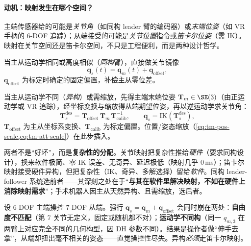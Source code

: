 \paragraph{动机：映射发生在哪个空间？}
主端传感器给的可能是\emph{关节角}（如同构 leader 臂的编码器）或\emph{末端位姿}（如 VR 手柄的 $6$-DOF 追踪）；从端接受的可能是\emph{关节位置}指令或\emph{笛卡尔位姿}（需 IK）。映射在关节空间还是笛卡尔空间，不只是工程便利，而是两种设计哲学。

\begin{definition}[关节空间映射]\label{def:tm-jointmap}
当主从运动学相同或高度相似（\emph{同构}臂），直接做关节镜像
\begin{equation}
  \mathbf{q}_s(t)=\mathbf{q}_m(t)+\mathbf{q}_{\text{offset}},
  \label{eq:tm-jointmap}
\end{equation}
$\mathbf{q}_{\text{offset}}$ 为标定时确定的固定偏置，补偿主从零位差。
\end{definition}

\begin{definition}[笛卡尔空间映射]\label{def:tm-cartmap}
当主从运动学不同（\emph{异构}）或需缩放，先得主端末端位姿 $\mathbf{T}_m\in\SE(3)$（由正运动学或 VR 追踪），经坐标变换与缩放得从端期望位姿，再以逆运动学求关节角：
\begin{equation}
  \mathbf{T}_s^{\text{des}}=\mathbf{T}_{\text{offset}}\,\mathbf{T}_m\,\mathbf{T}_{\text{calib}}^{-1},
  \qquad \mathbf{q}_s=\mathrm{IK}(\mathbf{T}_s^{\text{des}}),
  \label{eq:tm-cartmap}
\end{equation}
$\mathbf{T}_{\text{offset}}$ 为主从坐标系变换、$\mathbf{T}_{\text{calib}}$ 为标定偏置。位置/姿态缩放（\cref{eq:tm-pos-scale,eq:tm-att-scale}）在此步插入。
\end{definition}

\begin{insight}\label{ins:tm-tradeoff}
两者不是“好坏”，而是\textbf{复杂性的分配}。关节映射把复杂性推给\emph{硬件}（要求同构设计），换来软件极简、零 IK 误差、无奇异、延迟极低（映射几乎 $0\,$ms）；笛卡尔映射接受硬件异构，但把复杂性（IK、奇异、多解选择）留给\emph{软件}。同构 leader-follower 系统选前者——其深刻之处在于“\textbf{与其在软件里解决映射，不如在硬件上消除映射需求}”；手术机器人因主从天然异构、且需缩放，选后者。
\end{insight}

\begin{pitfall}[陷阱：对异构系统强行关节映射]
设 $6$-DOF 主端操控 $7$-DOF 从端。强行 $\mathbf{q}_s=\mathbf{q}_m+\mathbf{q}_{\text{offset}}$ 会同时崩在两处：\textbf{自由度不匹配}（第 $7$ 关节无定义，固定或随机都不对）；\textbf{运动学不同构}（同一 $q_{m,3}$ 在两臂上对应完全不同的几何构型，因 DH 参数不同）。结果是操作者做“伸手去拿”，从端却扭出毫不相关的姿态——直觉操控性尽失。异构\emph{必须}走笛卡尔映射。
\end{pitfall}

